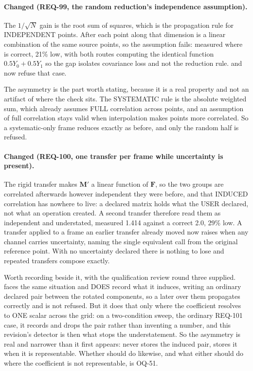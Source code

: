 \paragraph{Changed (REQ-99, the random reduction's independence
assumption).} The $1/\sqrt{N}$ gain is the root sum of squares, which is
the propagation rule for INDEPENDENT points. After 
each point along that dimension is a linear combination of the same
source points, so the assumption fails: measured
 where  is correct, 21\% low,
with both routes computing the identical function $0.5 Y_0 + 0.5 Y_1$ so
the gap isolates covariance loss and not the reduction rule.
 and  now refuse that case.

The asymmetry is the part worth stating, because it is a real property
and not an artifact of where the check sits. The SYSTEMATIC rule is the
absolute weighted sum, which already assumes FULL correlation across
points, and an assumption of full correlation stays valid when
interpolation makes points more correlated. So a systematic-only frame
reduces exactly as before, and only the random half is refused.

\paragraph{Changed (REQ-100, one transfer per frame while uncertainty is
present).} The rigid transfer makes $\mathbf{M}'$ a linear function of
$\mathbf{F}$, so the two groups are correlated afterwards however
independent they were before, and that INDUCED correlation has nowhere
to live: a declared matrix holds what the USER declared, not what an
operation created. A second transfer therefore read them as independent
and understated, measured 1.414 against a correct 2.0, 29\% low. A
transfer applied to a frame an earlier transfer already moved now
raises when any channel carries uncertainty, naming the single
equivalent call from the original reference point. With no uncertainty
declared there is nothing to lose and repeated transfers compose
exactly.

Worth recording beside it, with the qualification review round three
supplied.  faces the same situation and DOES record
what it induces, writing an ordinary declared pair between the rotated
components, so a later  over them propagates correctly
and is not refused. But it does that only where the coefficient
resolves to ONE scalar across the grid: on a two-condition sweep, the
ordinary REQ-101 case, it records 
and drops the pair rather than inventing a number, and this revision's
detector is then what stops the understatement. So the asymmetry is
real and narrower than it first appears: 
never stores the induced pair,  stores it when it is
representable. Whether  should do likewise,
and what either should do where the coefficient is not representable,
is OQ-51.

